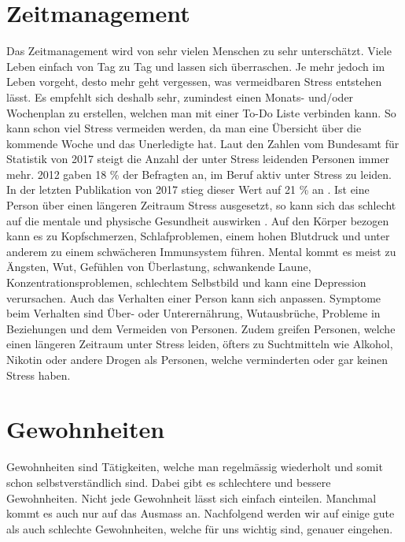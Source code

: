 \section{Zeitmanagement}
\authortoc{\jonas}{\sectionident}
Das Zeitmanagement wird von sehr vielen Menschen zu sehr unterschätzt. Viele Leben einfach von Tag zu Tag und lassen sich überraschen. Je mehr jedoch im Leben vorgeht, desto mehr geht vergessen, was vermeidbaren Stress entstehen lässt. 
\newline
Es empfehlt sich deshalb sehr, zumindest einen Monats- und/oder Wochenplan zu erstellen, welchen man mit einer To-Do Liste verbinden kann. So kann schon viel Stress vermeiden werden, da man eine Übersicht über die kommende Woche und das Unerledigte hat. 
\newline
Laut den Zahlen vom Bundesamt für Statistik von 2017 steigt die Anzahl der unter Stress leidenden Personen immer mehr. 2012 gaben 18 \% der Befragten an, im Beruf aktiv unter Stress zu leiden. In der letzten Publikation von 2017 stieg dieser Wert auf 21 \% an \cite{bundesamtfrstatistik_2019_arbeitsbedingungen}. Ist eine Person über einen längeren Zeitraum Stress ausgesetzt, so kann sich das schlecht auf die mentale und physische Gesundheit auswirken \cite{stress-symptoms}. Auf den Körper bezogen kann es zu Kopfschmerzen, Schlafproblemen, einem hohen Blutdruck und unter anderem zu einem schwächeren Immunsystem führen. Mental kommt es meist zu Ängsten, Wut, Gefühlen von Überlastung, schwankende Laune, Konzentrationsproblemen, schlechtem Selbstbild und kann eine Depression verursachen. Auch das Verhalten einer Person kann sich anpassen. Symptome beim Verhalten sind Über- oder Unterernährung, Wutausbrüche, Probleme in Beziehungen und dem Vermeiden von Personen. Zudem greifen Personen, welche einen längeren Zeitraum unter Stress leiden, öfters zu Suchtmitteln wie Alkohol, Nikotin oder andere Drogen als Personen, welche verminderten oder gar keinen Stress haben.
\section{Gewohnheiten}
\authortoc{\dario}{\sectionident}
Gewohnheiten sind Tätigkeiten, welche man regelmässig wiederholt und somit schon selbstverständlich sind. Dabei gibt es schlechtere und bessere Gewohnheiten.
\newline
Nicht jede Gewohnheit lässt sich einfach einteilen. Manchmal kommt es auch nur auf das Ausmass an.
\newline
Nachfolgend werden wir auf einige gute als auch schlechte Gewohnheiten, welche für uns wichtig sind, genauer eingehen. 
\newline
